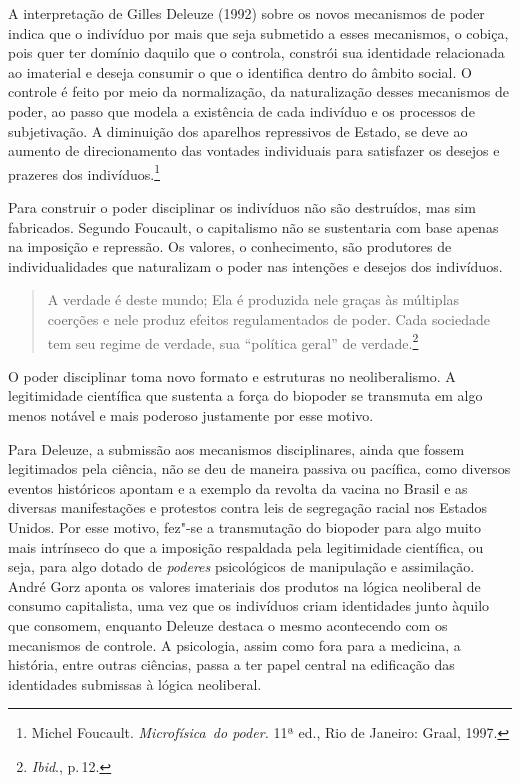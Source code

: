 A interpretação de Gilles Deleuze (1992) sobre os novos mecanismos de
poder indica que o indivíduo por mais que seja submetido a esses
mecanismos, o cobiça, pois quer ter domínio daquilo que o controla,
constrói sua identidade relacionada ao imaterial e deseja consumir o que
o identifica dentro do âmbito social. O controle é feito por meio da
normalização, da naturalização desses mecanismos de poder, ao passo que
modela a existência de cada indivíduo e os processos de subjetivação. A
diminuição dos aparelhos repressivos de Estado, se deve ao aumento de
direcionamento das vontades individuais para satisfazer os desejos e
prazeres dos indivíduos.\footnote{Michel Foucault. \textit{Microfísica~do poder.} 11ª ed., Rio de Janeiro: Graal, 1997.}

Para construir o poder disciplinar os indivíduos não são destruídos,
mas sim fabricados. Segundo Foucault, o capitalismo não se sustentaria
com base apenas na imposição e repressão. Os valores, o conhecimento,
são produtores de individualidades que naturalizam o poder nas intenções
e desejos dos indivíduos.

\begin{quote}
A verdade é deste mundo; Ela é produzida nele graças às múltiplas
coerções e nele produz efeitos regulamentados de poder. Cada sociedade
tem seu regime de verdade, sua ``política geral'' de verdade.\footnote{\textit{Ibid}., p.\,12.}
\end{quote}

O poder disciplinar toma novo formato e estruturas no neoliberalismo. A
legitimidade científica que sustenta a força do biopoder se transmuta em
algo menos notável e mais poderoso justamente por esse motivo.

Para Deleuze, a submissão aos mecanismos disciplinares, ainda que fossem
legitimados pela ciência, não se deu de maneira passiva ou pacífica,
como diversos eventos históricos apontam e a exemplo da revolta da
vacina no Brasil e as diversas manifestações e protestos contra leis de
segregação racial nos Estados Unidos. Por esse motivo, fez"-se a
transmutação do biopoder para algo muito mais intrínseco do que a
imposição respaldada pela legitimidade científica, ou seja, para algo
dotado de \textit{poderes} psicológicos de manipulação e assimilação. André
Gorz aponta os valores imateriais dos produtos na lógica neoliberal de
consumo capitalista, uma vez que os indivíduos criam identidades junto
àquilo que consomem, enquanto Deleuze destaca o mesmo acontecendo com os
mecanismos de controle. A psicologia, assim como fora para a medicina, a
história, entre outras ciências, passa a ter papel central na edificação
das identidades submissas à lógica neoliberal.

